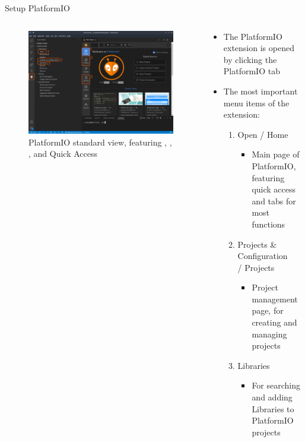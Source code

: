 \documentclass[aspectratio=169]{beamer}
\begin{document}
\begin{frame}{Setup PlatformIO}
\begin{columns}
	\begin{column}{0.5\textwidth}
		\begin{figure}
  			\includegraphics[width=\textwidth,keepaspectratio=true]{assets/pictures/pio-menu.png}
  			\caption{PlatformIO standard view, featuring , , , and Quick Access}
  			\label{fig:pio-menu}
		\end{figure}
	\end{column}
	\begin{column}{0.5\textwidth}
		\begin{textBox}
			\begin{itemize}
				\item The PlatformIO extension is opened by clicking the PlatformIO tab 
				\item The most important menu items of the extension:
				\begin{enumerate}
					\item Open / Home
					\begin{itemize}
						\item Main page of PlatformIO, featuring quick access and tabs for most functions
					\end{itemize}
					\item Projects \& Configuration \\/ Projects
					\begin{itemize}
						\item Project management page, for creating and managing projects
					\end{itemize}
					\item Libraries
					\begin{itemize}
						\item For searching and adding Libraries to PlatformIO projects
					\end{itemize}
				\end{enumerate}
			\end{itemize}
		\end{textBox}
	\end{column}
\end{columns}
\end{frame}
\end{document}
